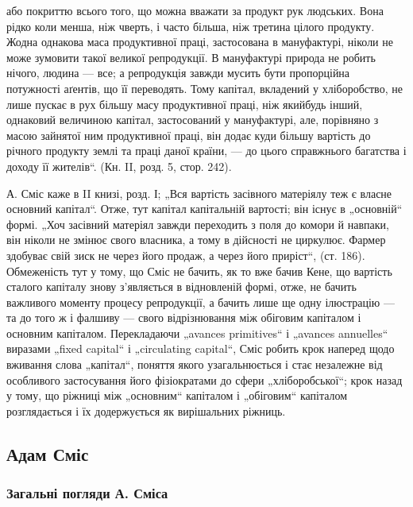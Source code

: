 \parcont{}  %
або покриттю всього того, що можна вважати за продукт рук людських.
Вона рідко коли менша, ніж чверть, і часто більша, ніж третина цілого
продукту. Жодна однакова маса продуктивної праці, застосована в мануфактурі,
ніколи не може зумовити такої великої репродукції. В мануфактурі
природа не робить нічого, людина — все; а репродукція завжди
мусить бути пропорційна потужності аґентів, що її переводять. Тому
капітал, вкладений у хліборобство, не лише пускає в рух більшу масу
продуктивної праці, ніж якийбудь інший, однаковий величиною капітал,
застосований у мануфактурі, але, порівняно з масою зайнятої ним продуктивної
праці, він додає куди більшу вартість до річного продукту
землі та праці даної країни, — до цього справжнього багатства і доходу
її жителів“. (Кн. II, розд. 5, стор. 242).

А. Сміс каже в II книзі, розд. І; „Вся вартість засівного матеріялу
теж є власне основний капітал“. Отже, тут капітал \deq{} капітальній вартості;
він існує в „основній“ формі. „Хоч засівний матеріял завжди переходить
з поля до комори й навпаки, він ніколи не змінює свого власника, а тому
в дійсності не циркулює. Фармер здобуває свій зиск не через його продаж,
а через його приріст“, (ст. 186). Обмеженість тут у тому, що Сміс
не бачить, як то вже бачив Кене, що вартість сталого капіталу знову
з’являється в відновленій формі, отже, не бачить важливого моменту
процесу репродукції, а бачить лише ще одну ілюстрацію — та до того ж
і фалшиву — свого відрізнювання між обіговим капіталом і основним
капіталом. Перекладаючи „avances primitives“ і „avances annuelles“
виразами „fixed capital“ і „circulating capital“, Сміс робить крок наперед
щодо вживання слова „капітал“, поняття якого узагальнюється і стає
незалежне від особливого застосування його фізіократами до сфери
„хліборобської“; крок назад у тому, що ріжниці між „основним“ капіталом
і „обіговим“ капіталом розглядається і їх додержується як вирішальних
ріжниць.

\subsection{Адам Сміс}

\subsubsection{Загальні погляди А. Сміса}

